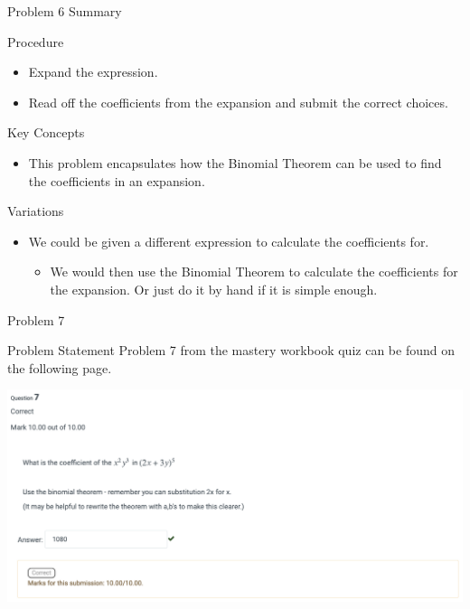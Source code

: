 \begin{summary}{Problem 6 Summary}
    \begin{statement}{Procedure}
        \begin{itemize}
            \item Expand the expression.
            \item Read off the coefficients from the expansion and submit the correct choices.
        \end{itemize}
    \end{statement}
    \begin{statement}{Key Concepts}
        \begin{itemize}
            \item This problem encapsulates how the Binomial Theorem can be used to find the coefficients in an expansion.
        \end{itemize}
    \end{statement}
    \begin{statement}{Variations}
        \begin{itemize}
            \item We could be given a different expression to calculate the coefficients for.
            \begin{itemize}
                \item We would then use the Binomial Theorem to calculate the coefficients for the expansion. Or just do it by hand if it is simple enough.
            \end{itemize}
        \end{itemize}
    \end{statement}
\end{summary}

\begin{problem}{Problem 7}
    \begin{statement}{Problem Statement}
        Problem 7 from the mastery workbook quiz can be found on the following page.
    \end{statement}
    \begin{Highlight}[Solution]
        \begin{center}
            \includegraphics[width = 1.0\textwidth]{Images/Problem 7.png}
        \end{center}
    \end{Highlight}
\end{problem}

